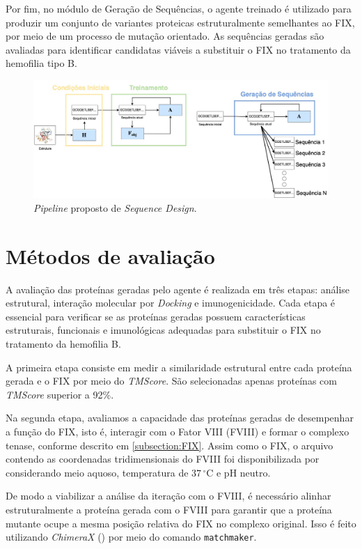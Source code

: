 Por fim, no módulo de Geração de Sequências, 
o agente treinado é utilizado para produzir um conjunto de variantes proteicas estruturalmente semelhantes ao FIX,
por meio de um processo de mutação orientado. 
As sequências geradas são avaliadas para identificar candidatas viáveis 
a substituir o FIX no tratamento da hemofilia tipo B.

\begin{figure}[H]
  \centering
  \includegraphics[width=.8\textwidth]{figuras/metodologia-pipeline_proposta.jpg}
  \caption{\textit{Pipeline} proposto de \textit{Sequence Design}.}
  \label{fig:proposta}
\end{figure}


\section{Métodos de avaliação}

A avaliação das proteínas geradas pelo agente é realizada em três etapas: 
análise estrutural, interação molecular por \textit{Docking} e imunogenicidade. 
Cada etapa é essencial para verificar se as proteínas geradas possuem características estruturais, 
funcionais e imunológicas adequadas para substituir o FIX no tratamento da hemofilia B.  

A primeira etapa consiste em medir a similaridade estrutural entre cada proteína gerada
e o FIX por meio do \textit{TMScore}. 
São selecionadas apenas proteínas com \textit{TMScore} superior a 92\%.

Na segunda etapa, avaliamos a capacidade das proteínas geradas de desempenhar a função do FIX, 
isto é, interagir com o Fator VIII (FVIII) e formar o complexo tenase, conforme descrito em \ref{subsection:FIX}.
Assim como o FIX, o arquivo contendo as coordenadas tridimensionais do FVIII foi disponibilizada por \cite{CS} 
considerando meio aquoso, temperatura de $37\,^\circ\mathrm{C}$ e pH neutro. 

De modo a viabilizar a análise da iteração com o FVIII, 
é necessário alinhar estruturalmente a proteína gerada com o FVIII
para garantir que a proteína mutante ocupe a mesma posição relativa do FIX no complexo original. 
Isso é feito utilizando \textit{ChimeraX} (\cite{ChimeraX}) por meio do comando \texttt{matchmaker}.

